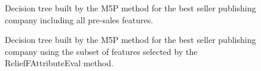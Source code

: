 \documentclass[a4paper,10pt,twocolumn,preprint,3p]{elsarticle}
\begin{document}
\begin{figure}[!ht] 
\begin{center}
\caption{Decision tree built by the M5P method for the best seller publishing 
	company including all pre-sales features.}
\label{fig:decision_tree_best_seller}
\end{center}
\end{figure}

\begin{figure}[!ht] 
\begin{center}
\caption{Decision tree built by the M5P method for the best seller
  publishing company using  the subset of features selected by the
  {\sf ReliefFAttributeEval} method.} 
\label{fig:decision_tree_best_seller_fs}
\end{center}
\end{figure}
\end{document}
